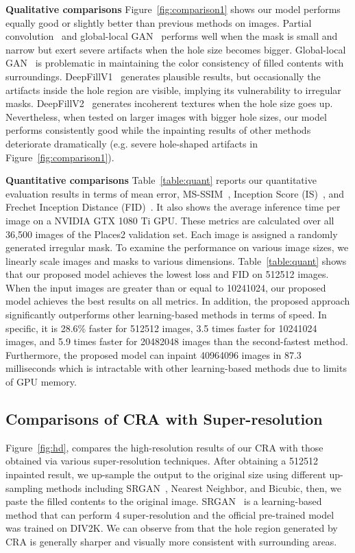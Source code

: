 \documentclass[oribibl]{llncs}  \usepackage[width=122mm,left=12mm,paperwidth=146mm,height=193mm,top=12mm,paperheight=217mm]{geometry}
\begin{document}
\noindent\textbf{Qualitative comparisons} Figure~\ref{fig:comparison1} shows our model performs equally good or slightly better than previous methods on  images. Partial convolution~\cite{liu2018image} and global-local GAN~\cite{iizuka2017globally} performs well when the mask is small and narrow but exert severe artifacts when the hole size becomes bigger. Global-local GAN~\cite{iizuka2017globally} is problematic in maintaining the color consistency of filled contents with surroundings. DeepFillV1~\cite{yu2018generative} generates plausible results, but occasionally the artifacts inside the hole region are visible, implying its vulnerability to irregular masks. DeepFillV2~\cite{yu2018free} generates incoherent textures when the hole size goes up. Nevertheless, when tested on larger images with bigger hole sizes, our model performs consistently good while the inpainting results of other methods deteriorate dramatically (e.g. severe hole-shaped artifacts in Figure~\ref{fig:comparison1}).

\noindent\textbf{Quantitative comparisons} Table~\ref{table:quant} reports our quantitative evaluation results in terms of mean  error, MS-SSIM~\cite{wang2003multiscale}, Inception Score (IS)~\cite{salimans2016improved}, and Frechet Inception Distance (FID)~\cite{heusel2017gans}. It also shows the average inference time per image on a NVIDIA GTX 1080 Ti GPU. These metrics are calculated over all 36,500 images of the Places2 validation set. Each image is assigned a randomly generated irregular mask. To examine the performance on various image sizes, we linearly scale images and masks to various dimensions. Table~\ref{table:quant} shows that our proposed model achieves the lowest  loss and FID on 512512 images. When the input images are greater than or equal to 10241024, our proposed model achieves the best results on all metrics. In addition, the proposed approach significantly outperforms other learning-based methods in terms of speed. In specific, it is 28.6\% faster for 512512 images, 3.5 times faster for 10241024 images, and 5.9 times faster for 20482048 images than the second-fastest method. Furthermore, the proposed model can inpaint 40964096 images in 87.3 milliseconds which is intractable with other learning-based methods due to limits of GPU memory.

\subsection{Comparisons of CRA with Super-resolution} 
Figure~\ref{fig:hd}, compares the high-resolution results of our CRA with those obtained via various super-resolution techniques. After obtaining a 512512 inpainted result, we up-sample the output to the original size using different up-sampling methods including SRGAN~\cite{ledig2017photo}, Nearest Neighbor, and Bicubic, then, we paste the filled contents to the original image. SRGAN~\cite{ledig2017photo} is a learning-based method that can perform 4 super-resolution and the official pre-trained model was trained on DIV2K. We can observe from that the hole region generated by CRA is generally sharper and visually more consistent with surrounding areas.
\end{document}
